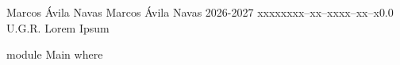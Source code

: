 \documentclass{tstextbook}
\begin{document}
       {Marcos Ávila Navas}
       {Marcos Ávila Navas}
       {2026-2027}
       {xxxxx}{xxx--xx--xxxx--xx--x}{0.0}
       {U.G.R.}
       {Lorem Ipsum}



\begin{code}

module Main where


\end{code}
\end{document}
